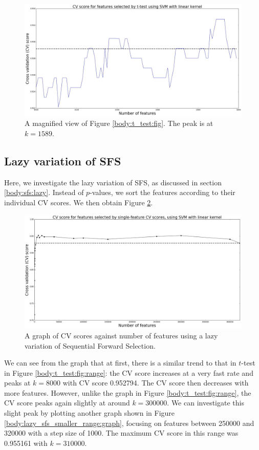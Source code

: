 \documentclass[12pt, twoside, a4paper]{report}
\begin{document}
\begin{figure}
\centering
\includegraphics[width=\textwidth]{images/t_test_2000_uneq_var_zoom.jpeg}
\caption{A magnified view of Figure \ref{body:t_test:fig}. The peak is at $k=1589$.}
\label{body:t_test:fig_zoom}
\end{figure}

\subsection{Lazy variation of SFS}
Here, we investigate the lazy variation of SFS, as discussed in section \ref{body:sfs:lazy}. Instead of $p$-values, we sort the features according to their individual CV scores. We then obtain Figure \ref{body:lazy_sfs:graph}. 

\begin{figure}
\centering
\includegraphics[width=\textwidth]{images/lazy_sfs_range.jpeg}
\caption{A graph of CV scores against number of features using a lazy variation of Sequential Forward Selection.}
\label{body:lazy_sfs:graph}
\end{figure}

We can see from the graph that at first, there is a similar trend to that in $t$-test in Figure \ref{body:t_test:fig:range}: the CV score increases at a very fast rate and peaks at $k=8000$ with CV score 0.952794.  The CV score then decreases with more features. However, unlike the graph in Figure \ref{body:t_test:fig:range}, the CV score peaks again slightly at around $k=300000$. We can investigate this slight peak by plotting another graph shown in Figure \ref{body:lazy_sfs_smaller_range:graph}, focusing on features between 250000 and 320000 with a step size of 1000. The maximum CV score in this range was 0.955161 with $k=310000$.
\end{document}
